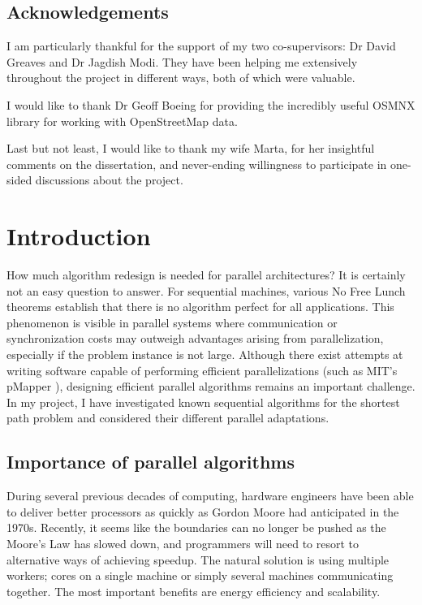 \documentclass[12pt,a4paper,twoside,openright]{report}
\begin{document}
\newpage
\section*{Acknowledgements}

I am particularly thankful for the support of my two co-supervisors: Dr David Greaves and Dr Jagdish Modi. They have been helping me extensively throughout the project in different ways, both of which were valuable.

I would like to thank Dr Geoff Boeing for providing the incredibly useful OSMNX library for working with OpenStreetMap data\cite{Boeing2017}.

Last but not least, I would like to thank my wife Marta, for her insightful comments on the dissertation, and never-ending willingness to participate in one-sided discussions about the project.

\tableofcontents

\pagestyle{headings}
\chapter{Introduction}
How much algorithm redesign is needed for parallel architectures? It is certainly not an easy question to answer. For sequential machines, various No Free Lunch theorems \cite{free-lunch} establish that there is no algorithm perfect for all applications. This phenomenon is  visible in parallel systems where communication or synchronization costs may outweigh advantages arising from parallelization, especially if the problem instance is not large. Although there exist attempts at writing software capable of performing efficient parallelizations (such as MIT's pMapper \cite{pmapper}), designing efficient parallel algorithms remains an important challenge. In my project, I have investigated known sequential algorithms for the shortest path problem and considered their different parallel adaptations.
\section{Importance of parallel algorithms}
During several previous decades of computing, hardware engineers have been able to deliver better processors as quickly as Gordon Moore had anticipated in the 1970s. Recently, it seems like the boundaries can no longer be pushed as the Moore's Law has slowed down\cite{moore-law}, and programmers will need to resort to alternative ways of achieving speedup. The natural solution is using multiple workers; cores on a single machine or simply several machines communicating together. The most important benefits are energy efficiency and scalability. 
\end{document}
